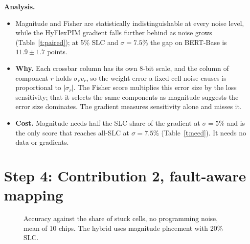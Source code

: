 \documentclass[10pt,a4paper]{article}
\begin{document}
\noindent\textbf{Analysis.}
\begin{itemize}
\item Magnitude and Fisher are statistically indistinguishable at every noise level, while the HyFlexPIM
gradient falls further behind as noise grows (Table~\ref{t:paired}); at 5\% SLC and $\sigma=7.5\%$ the gap on
BERT-Base is $11.9\pm1.7$ points.
\item \textbf{Why.} Each crossbar column has its own 8-bit scale, and the column of component $r$ holds
$\sigma_r v_r$, so the weight error a fixed cell noise causes is proportional to $|\sigma_r|$. The Fisher score
multiplies this error size by the loss sensitivity; that it selects the same components as magnitude
suggests the error size dominates. The gradient measures sensitivity alone and misses it.
\item \textbf{Cost.} Magnitude needs half the SLC share of the gradient at $\sigma=5\%$ and is the only score
that reaches all-SLC at $\sigma=7.5\%$ (Table~\ref{t:need}). It needs no data or gradients.
\end{itemize}

\section*{Step 4: Contribution 2, fault-aware mapping}
\begin{figure}[H]
\centering
{}\hfill
{}
\caption{Accuracy against the share of stuck cells, no programming noise, mean of 10 chips. The hybrid uses
magnitude placement with 20\% SLC.}\label{f:map}
\end{figure}
\end{document}

